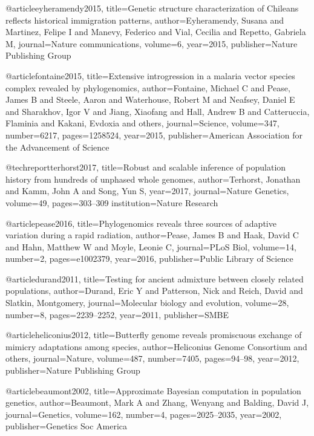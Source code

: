 @article{eyheramendy2015,
  title={Genetic structure characterization of Chileans reflects historical immigration patterns},
  author={Eyheramendy, Susana and Martinez, Felipe I and Manevy, Federico and Vial, Cecilia and Repetto, Gabriela M},
  journal={Nature communications},
  volume={6},
  year={2015},
  publisher={Nature Publishing Group}
}


@article{fontaine2015,
  title={Extensive introgression in a malaria vector species complex revealed by phylogenomics},
  author={Fontaine, Michael C and Pease, James B and Steele, Aaron and Waterhouse, Robert M and Neafsey, Daniel E and Sharakhov, Igor V and Jiang, Xiaofang and Hall, Andrew B and Catteruccia, Flaminia and Kakani, Evdoxia and others},
  journal={Science},
  volume={347},
  number={6217},
  pages={1258524},
  year={2015},
  publisher={American Association for the Advancement of Science}
}

@techreport{terhorst2017,
  title={Robust and scalable inference of population history from hundreds of unphased whole genomes},
  author={Terhorst, Jonathan and Kamm, John A and Song, Yun S},
  year={2017},
  journal={Nature Genetics},
  volume={49},
  pages={303--309}
  institution={Nature Research}
}

@article{pease2016,
  title={Phylogenomics reveals three sources of adaptive variation during a rapid radiation},
  author={Pease, James B and Haak, David C and Hahn, Matthew W and Moyle, Leonie C},
  journal={PLoS Biol},
  volume={14},
  number={2},
  pages={e1002379},
  year={2016},
  publisher={Public Library of Science}
}

@article{durand2011,
  title={Testing for ancient admixture between closely related populations},
  author={Durand, Eric Y and Patterson, Nick and Reich, David and Slatkin, Montgomery},
  journal={Molecular biology and evolution},
  volume={28},
  number={8},
  pages={2239--2252},
  year={2011},
  publisher={SMBE}
}

@article{heliconius2012,
  title={Butterfly genome reveals promiscuous exchange of mimicry adaptations among species},
  author={Heliconius Genome Consortium and others},
  journal={Nature},
  volume={487},
  number={7405},
  pages={94--98},
  year={2012},
  publisher={Nature Publishing Group}
}


@article{beaumont2002,
  title={Approximate Bayesian computation in population genetics},
  author={Beaumont, Mark A and Zhang, Wenyang and Balding, David J},
  journal={Genetics},
  volume={162},
  number={4},
  pages={2025--2035},
  year={2002},
  publisher={Genetics Soc America}
}

